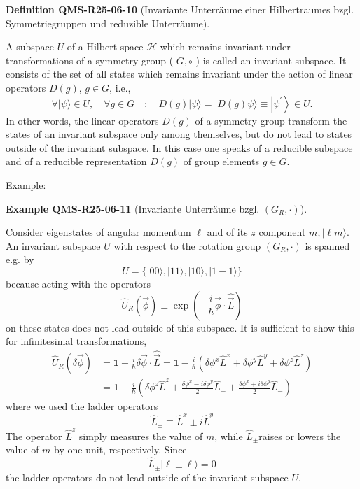 \documentclass[10pt, letterpaper]{article}
\newcommand{\CustomHeading}[3]{%
  \par\medskip\noindent%
  \textbf{#1 #2} \textnormal{(#3)}.\enskip%
}
\newenvironment{DEF}[2]{\begin{unitbox}\CustomHeading{Definition}{#1}{#2}}{\end{unitbox}}
\newenvironment{EXA}[2]{\begin{unitbox}\CustomHeading{Example}{#1}{#2}}{\end{unitbox}}
\begin{document}
\begin{DEF}{QMS-R25-06-10}{Invariante Unterräume einer Hilbertraumes bzgl. Symmetriegruppen und reduzible Unterräume}
A subspace $U$ of a Hilbert space $\mathcal{H}$ which remains invariant under transformations of a symmetry group ( $G, \circ$ ) is called an invariant subspace. It consists of the set of all states which remains invariant under the action of linear operators $D(g)$, $g \in G$, i.e.,
$$
\forall|\psi\rangle \in U, \quad \forall g \in G \quad: \quad D(g)|\psi\rangle=|D(g) \psi\rangle \equiv\left|\psi^{\prime}\right\rangle \in U .
$$
In other words, the linear operators $D(g)$ of a symmetry group transform the states of an invariant subspace only among themselves, but do not lead to states outside of the invariant subspace. In this case one speaks of a reducible subspace and of a reducible representation $D(g)$ of group elements $g \in G$.
\end{DEF}


Example: 

\begin{EXA}{QMS-R25-06-11}{Invariante Unterräume bzgl. $(G_{R}, \cdot)$}
Consider eigenstates of angular momentum $\ell$ and of its $z$ component $m,|\ell m\rangle$. An invariant subspace $U$ with respect to the rotation group $(G_{R}, \cdot)$ is spanned e.g. by
$$
U=\{|00\rangle,|11\rangle,|10\rangle,|1-1\rangle\}
$$
because acting with the operators 
$$\hat{U}_R(\vec{\phi}) \equiv \exp \left(-\frac{i}{\hbar} \vec{\phi} \cdot \hat{\vec{L}}\right)$$
on these states does not lead outside of this subspace. It is sufficient to show this for infinitesimal transformations,
$$
\begin{aligned}
\hat{U}_{R}(\delta \vec{\phi}) & =\mathbf{1}-\frac{i}{\hbar} \delta \vec{\phi} \cdot \hat{\vec{L}}=\mathbf{1}-\frac{i}{\hbar}\left(\delta \phi^{x} \hat{L}^{x}+\delta \phi^{y} \hat{L}^{y}+\delta \phi^{z} \hat{L}^{z}\right) \\
& =\mathbf{1}-\frac{i}{\hbar}\left(\delta \phi^{z} \hat{L}^{z}+\frac{\delta \phi^{x}-i \delta \phi^{y}}{2} \hat{L}_{+}+\frac{\delta \phi^{x}+i \delta \phi^{y}}{2} \hat{L}_{-}\right)
\end{aligned}
$$
where we used the ladder operators
$$
\hat{L}_{ \pm} \equiv \hat{L}^{x} \pm i \hat{L}^{y}
$$
The operator $\hat{L}^{z}$ simply measures the value of $m$, while $\hat{L}_{ \pm}$raises or lowers the value of $m$ by one unit, respectively. Since
$$
\hat{L}_{ \pm}|\ell \pm \ell\rangle=0
$$
the ladder operators do not lead outside of the invariant subspace $U$.
\end{EXA}
\end{document}

